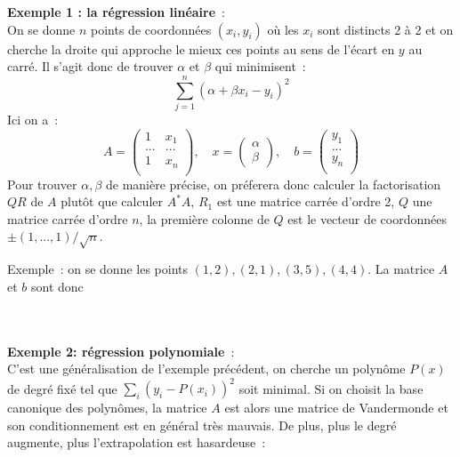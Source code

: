 \documentclass[a4paper,11pt]{article}
\begin{document}
\begin{giacjshere}
{\bf Exemple 1 : la r\'egression lin\'eaire}~:\\
On se donne $n$ points de coordonn\'ees $(x_i,y_i)$ o\`u les $x_i$
sont distincts 2 \`a 2 et on cherche
la droite qui approche le mieux ces points au sens de l'\'ecart en $y$
au carr\'e. Il s'agit donc de trouver $\alpha$ et $\beta$ qui minimisent~:
$$  \sum_{j=1}^n (\alpha+\beta x_i-y_i)^2 $$
Ici on a~:
$$ A=\left( \begin{array}{cc}
1 & x_1 \\
... & ... \\
1 & x_n  \\
\end{array} \right), \quad 
x=\left( \begin{array}{c} \alpha \\ \beta \end{array}\right),
\quad
b=\left( \begin{array}{c}
y_1  \\
...  \\
y_n  \\
\end{array} 
\right)$$
Pour trouver $\alpha, \beta$ de mani\`ere pr\'ecise, on pr\'eferera
donc calculer la factorisation $QR$ de $A$ plut\^ot que calculer $A^*A$, $R_1$ est
une matrice carr\'ee d'ordre 2, $Q$ une matrice carr\'ee d'ordre $n$, 
la premi\`ere colonne de $Q$ est le vecteur de coordonn\'ees
$\pm (1,...,1)/\sqrt{n}$.

Exemple~: on se donne les points $(1,2), (2,1), (3,5), (4,4)$. La
matrice $A$ et $b$ sont donc\\
\\
\\

{\bf Exemple 2: r\'egression polynomiale}~:\\
C'est une g\'en\'eralisation de l'exemple pr\'ec\'edent, on cherche un polyn\^ome $P(x)$
de degr\'e fix\'e tel que $\sum_i (y_i-P(x_i))^2$ soit minimal. Si on
choisit la base canonique des polyn\^omes, la
matrice $A$ est alors une matrice de Vandermonde 
et son conditionnement est en g\'en\'eral tr\`es mauvais. 
De plus, plus le degr\'e augmente, plus l'extrapolation 
est hasardeuse~:\\
\\


\end{giacjshere}
\end{document}
